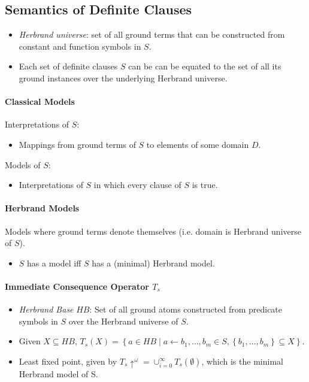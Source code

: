 \documentclass[twocolumn,english]{article}
\begin{document}
\subsection{Semantics of Definite Clauses}
\begin{itemize}
\item \emph{Herbrand universe}: set of all ground terms that can be constructed
from constant and function symbols in $S$.
\item Each set of definite clauses $S$ can be can be equated to the set
of all its ground instances over the underlying Herbrand universe.
\end{itemize}

\paragraph{Classical Models}

Interpretations of $S$:
\begin{itemize}
\item Mappings from ground terms of $S$ to elements of some domain $D$.
\end{itemize}
Models of $S$:
\begin{itemize}
\item Interpretations of $S$ in which every clause of $S$ is true.
\end{itemize}

\paragraph{Herbrand Models}

Models where ground terms denote themselves (i.e. domain is Herbrand
universe of $S$).
\begin{itemize}
\item $S$ has a model iff $S$ has a (minimal) Herbrand model.
\end{itemize}

\paragraph{Immediate Consequence Operator $T_{s}$}
\begin{itemize}
\item \emph{Herbrand Base} $HB$: Set of all ground atoms constructed from
predicate symbols in $S$ over the Herbrand universe of $S$.
\item Given $X\subseteq HB$, $T_{s}\left(X\right)=\left\{ a\in HB\mid a\leftarrow b_{1},\dots,b_{m}\in S,\left\{ b_{1},\dots,b_{m}\right\} \subseteq X\right\} $.
\item Least fixed point, given by $T_{s}\uparrow^{\omega}=\cup_{i=0}^{\infty}T_{s}\left(\emptyset\right)$,
which is the minimal Herbrand model of S.
\end{itemize}
\end{document}
